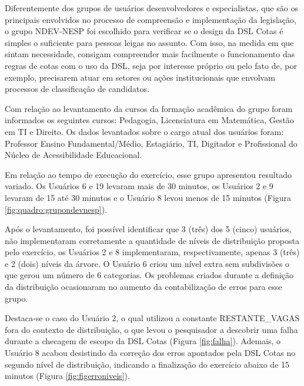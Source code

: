 Diferentemente dos grupos de usuários desenvolvedores e especialistas, que são os principais envolvidos no processo de compreensão e implementação da legislação, o grupo NDEV-NESP foi escolhido para verificar se o design da DSL Cotas é simples o suficiente para pessoas leigas no assunto. Com isso, na medida em que sintam necessidade, consigam compreender mais facilmente o funcionamento das regras de cotas com o uso da DSL, seja por interesse próprio ou pelo fato de, por exemplo, precisarem atuar em setores ou ações institucionais que envolvam processos de classificação de candidatos.


Com relação ao levantamento da cursos da formação acadêmica do grupo foram informados os seguintes cursos: Pedagogia, Licenciatura em Matemática, Gestão em TI e Direito. Os dados levantados sobre o cargo atual dos usuários foram: Professor Ensino Fundamental/Médio, Estagiário, TI, Digitador e Profissional do Núcleo de Acessibilidade Educacional.

Em relação ao tempo de execução do exercício, esse grupo apresentou resultado variado. Os Usuários 6 e 19 levaram mais de 30 minutos, os Usuários 2 e 9 levaram de 15 até 30 minutos e o Usuário 8 levou menos de 15 minutos (Figura \ref{fig:quadro:grupondevnesp}). 



\newpage

Após o levantamento, foi possível identificar que 3 (três) dos 5 (cinco) usuários, não implementaram corretamente a quantidade de níveis de distribuição proposta pelo exercício, os Usuários 2 e 8 implementaram, respectivamente, apenas 3 (três) e 2 (dois) níveis da árvore. O Usuário 6 criou um nível extra sem subdivisões o que gerou um número de 6 categorias. Os problemas criados durante a definição da distribuição ocasionaram no aumento da contabilização de erros para esse grupo. 

Destaca-se o caso do Usuário 2, o qual utilizou a constante RESTANTE\_VAGAS fora do contexto de distribuição, o que levou o pesquisador a descobrir uma falha durante a checagem de escopo da DSL Cotas (Figura \ref{fig:falha}). Ademais, o Usuário 8 acabou desistindo da correção dos erros apontados pela DSL Cotas no segundo nível de distribuição, indicando a finalização do exercício abaixo de 15 minutos (Figura \ref{fig:figerroniveis}).





